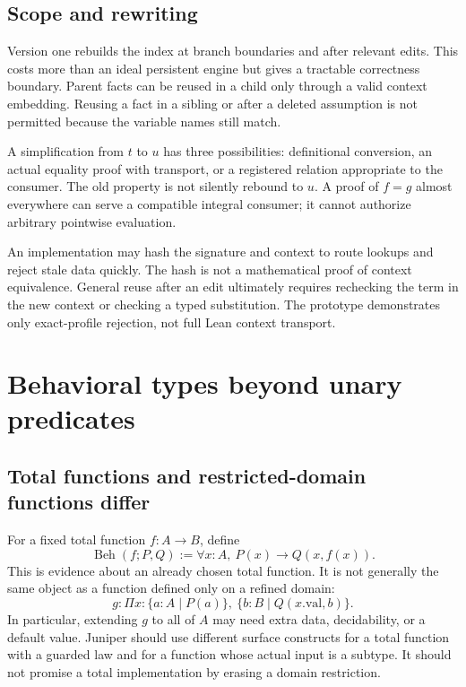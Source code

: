 \documentclass[11pt,a4paper]{article}
\newcommand{\Beh}{\operatorname{Beh}}\newcommand{\Req}{\operatorname{Req}}
\theoremstyle{definition}\newtheorem{definition}[theorem]{Definition}
\theoremstyle{remark}\newtheorem{remark}[theorem]{Remark}
\begin{document}
\subsection{Scope and rewriting}
Version one rebuilds the index at branch boundaries and after relevant edits. This costs more than an ideal persistent engine but gives a tractable correctness boundary. Parent facts can be reused in a child only through a valid context embedding. Reusing a fact in a sibling or after a deleted assumption is not permitted because the variable names still match.

A simplification from $t$ to $u$ has three possibilities: definitional conversion, an actual equality proof with transport, or a registered relation appropriate to the consumer. The old property is not silently rebound to $u$. A proof of $f=g$ almost everywhere can serve a compatible integral consumer; it cannot authorize arbitrary pointwise evaluation.

An implementation may hash the signature and context to route lookups and reject stale data quickly. The hash is not a mathematical proof of context equivalence. General reuse after an edit ultimately requires rechecking the term in the new context or checking a typed substitution. The prototype demonstrates only exact-profile rejection, not full Lean context transport.

\section{Behavioral types beyond unary predicates}
\label{sec:behavior}
\subsection{Total functions and restricted-domain functions differ}
For a fixed total function $f:A\to B$, define
\[
 \Beh(f;P,Q):=\forall x:A,\ P(x)\to Q(x,f(x)).
\]
This is evidence about an already chosen total function. It is not generally the same object as a function defined only on a refined domain:
\[
 g:\Pi x:\{a:A\mid P(a)\},\ \{b:B\mid Q(x.\mathrm{val},b)\}.
\]
In particular, extending $g$ to all of $A$ may need extra data, decidability, or a default value. Juniper should use different surface constructs for a total function with a guarded law and for a function whose actual input is a subtype. It should not promise a total implementation by erasing a domain restriction.
\end{document}
